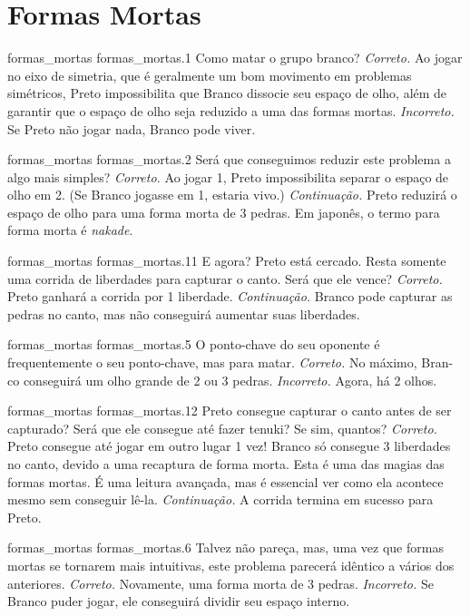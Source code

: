 \chapter{Formas Mortas}

\emptypage

\problemAnswerDiagram
  {formas_mortas}
  {formas_mortas.1}
  {Como matar o grupo branco?}
  {\emph{Correto.} Ao jogar no eixo de simetria, que é geralmente um bom movimento em problemas simétricos, Preto impossibilita que Branco dissocie seu espaço de olho, além de garantir que o espaço de olho seja reduzido a uma das formas mortas.}
  {\emph{Incorreto.} Se Preto não jogar nada, Branco pode viver.}

\problemAnswerDiagram
  {formas_mortas}
  {formas_mortas.2}
  {Será que conseguimos reduzir este problema a algo mais simples?}
  {\emph{Correto.} Ao jogar 1, Preto impossibilita separar o espaço de olho em 2. (Se Branco jogasse em 1, estaria vivo.)}
  {\emph{Continuação.} Preto reduzirá o espaço de olho para uma forma morta de 3 pedras. Em japonês, o termo para forma morta é \emph{nakade}.}

\problemAnswerDiagram
  {formas_mortas}
  {formas_mortas.11}
  {E agora? Preto está cercado. Resta somente uma corrida de liberdades para capturar o canto. Será que ele vence?}
  {\emph{Correto.} Preto ganhará a corrida por 1 liberdade.}
  {\emph{Continuação.} Branco pode capturar as pedras no canto, mas não conseguirá aumentar suas liberdades.}

\problemAnswerDiagram
  {formas_mortas}
  {formas_mortas.5}
  {O ponto-chave do seu oponente é frequentemente o seu ponto-chave, mas para matar.}
  {\emph{Correto.} No máximo, Bran-co conseguirá um olho grande de 2 ou 3 pedras.}
  {\emph{Incorreto.} Agora, há 2 olhos.}

\problemAnswerDiagram
  {formas_mortas}
  {formas_mortas.12}
  {Preto consegue capturar o canto antes de ser capturado? Será que ele consegue até fazer tenuki? Se sim, quantos?}
  {\emph{Correto.} Preto consegue até jogar em outro lugar 1 vez! Branco só consegue 3 liberdades no canto, devido a uma recaptura de forma morta. Esta é uma das magias das formas mortas. É uma leitura avançada, mas é essencial ver como ela acontece mesmo sem conseguir lê-la.}
  {\emph{Continuação.} A corrida termina em sucesso para Preto.}

\problemAnswerDiagram
  {formas_mortas}
  {formas_mortas.6}
  {Talvez não pareça, mas, uma vez que formas mortas se tornarem mais intuitivas, este problema parecerá idêntico a vários dos anteriores.}
  {\emph{Correto.} Novamente, uma forma morta de 3 pedras.}
  {\emph{Incorreto.} Se Branco puder jogar, ele conseguirá dividir seu espaço interno.}

